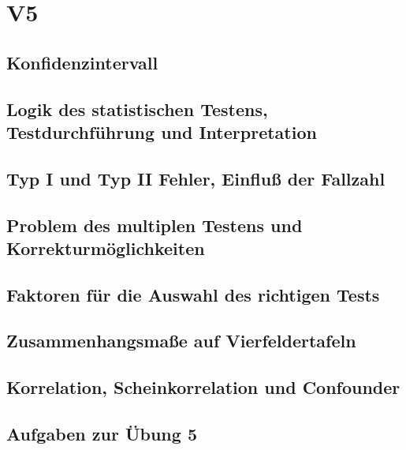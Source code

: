 \section{V5}
\subsection{Konfidenzintervall}

\subsection{Logik des statistischen Testens, Testdurchführung und Interpretation}

\subsection{Typ I und Typ II Fehler, Einfluß der Fallzahl}

\subsection{Problem des multiplen Testens und Korrekturmöglichkeiten}

\subsection{Faktoren für die Auswahl des richtigen Tests}

\subsection{Zusammenhangsmaße auf Vierfeldertafeln}

\subsection{Korrelation, Scheinkorrelation und Confounder}

\subsection{Aufgaben zur Übung 5}